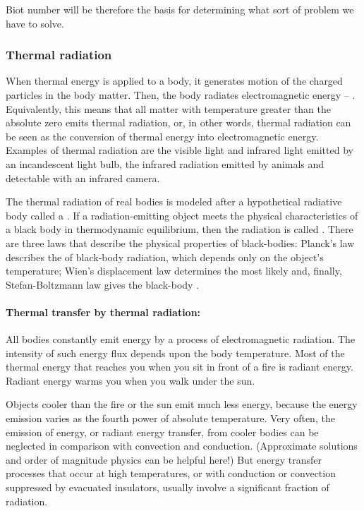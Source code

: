 Biot number will be therefore the basis for determining what sort of problem we have to solve.


\subsubsection{Thermal radiation}
When thermal energy is applied to a body, it generates motion of the charged particles in the body matter. Then, the body radiates electromagnetic energy -- . Equivalently, this means that all matter with temperature greater than the absolute zero emits thermal radiation, or, in other words, thermal radiation can be seen as the conversion of thermal energy into electromagnetic energy. Examples of thermal radiation are the visible light and infrared light emitted by an incandescent light bulb, the infrared radiation emitted by animals and detectable with an infrared camera.

The thermal radiation of real bodies is modeled after a hypothetical radiative body called a . If a radiation-emitting object meets the physical characteristics of a black body in thermodynamic equilibrium, then the radiation is called . There are three laws that describe the physical properties of black-bodies: Planck's law describes the  of black-body radiation, which depends only on the object's temperature; Wien's displacement law determines the most likely  and, finally, Stefan-Boltzmann law gives the black-body .

\paragraph{Thermal transfer by thermal radiation:}
All bodies constantly emit energy by a process of electromagnetic radiation. The intensity of such energy flux depends upon the body temperature. Most of the thermal energy that reaches you when you sit in front of a fire is radiant energy. Radiant energy warms you when you walk under the sun.

Objects cooler than the fire or the sun emit much less energy, because the energy emission varies as the fourth power of absolute temperature. Very often, the emission of energy, or radiant energy transfer, from cooler bodies can be neglected in comparison with convection and conduction. (Approximate solutions and order of magnitude physics can be helpful here!) But energy transfer processes that occur at high temperatures, or with conduction or convection suppressed by evacuated insulators, usually involve a significant fraction of radiation.

